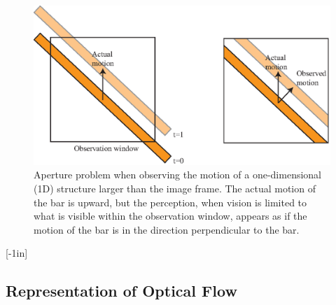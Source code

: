 \begin{figure}[t]
    \centerline{
        \includegraphics[width=.9\linewidth]{figures/optical_flow/apperture_problem.eps}}
    \caption{Aperture problem when observing the motion of a one-dimensional (1D) structure larger than the image frame. The actual motion of the bar is upward, but the perception, when vision is limited to what is visible within the observation window, appears as if the motion of the bar is in the direction perpendicular to the bar.}
    \label{fig:apperture_problem}
\end{figure}



[-1in]



\subsection{Representation of Optical Flow}

